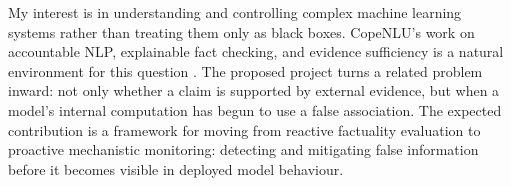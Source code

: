 \documentclass[10pt,a4paper]{article}
\begin{document}
\hspace*{2em}
My interest is in understanding and controlling complex machine learning systems rather than treating them only as black boxes. CopeNLU's work on accountable NLP, explainable fact checking, and evidence sufficiency is a natural environment for this question \cite{atanasova2020generating,atanasova2022fact}. The proposed project turns a related problem inward: not only whether a claim is supported by external evidence, but when a model's internal computation has begun to use a false association. The expected contribution is a framework for moving from reactive factuality evaluation to proactive mechanistic monitoring: detecting and mitigating false information before it becomes visible in deployed model behaviour.

\begingroup
\scriptsize
\setlength{\parskip}{0pt}
\setlength{\columnsep}{1.2em}
\end{document}
